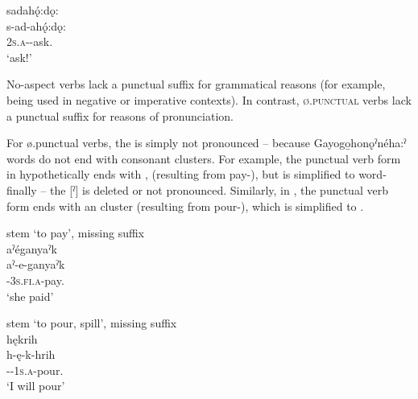 
\ex sadahǫ́:dǫ:\\\label{ex:punctendex4b}
\gll s-ad-ahǫ́:dǫ:\\
 \textsc{2s.a}-{\semireflexive}-ask.{\noaspect}\\
\glt `ask!'

\z
\z

No-aspect verbs lack a punctual suffix for grammatical reasons (for example, being used in negative or imperative contexts). In contrast, \textsc{ø.punctual} verbs lack a  punctual suffix for reasons of pronunciation.

For ø.punctual verbs, the  {\punctual} is simply not pronounced -- because Gayogo̱honǫˀnéha:ˀ words do not end with consonant clusters. For example, the punctual verb form in  hypothetically ends with , (resulting from  pay-{\punctual}), but  is simplified to   word-finally -- the [ˀ] {\punctual} is deleted or not pronounced. Similarly, in , the punctual verb form ends with an  cluster (resulting from  pour-{\punctual}), which is simplified to .

\ea\label{ex:punctendex2} stem  ‘to pay’, missing  \textsc{\punctual} suffix\\
aˀéganyaˀk\\\label{ex:punctendex2a}
\gll aˀ-e-ganyaˀk\\
 {\factual}-\textsc{3s.fi.a}-pay.{\zeropunctual}\\
\glt `she paid'
\z


\newpage
\ea\label{ex:punctendex3} stem  ‘to pour, spill’, missing  \textsc{\punctual} suffix\\
hękrih\\\label{ex:punctendex3a}
\gll h-ę-k-hrih\\
 {\translocative}-{\future}-\textsc{1s.a}-pour.{\zeropunctual}\\
\glt `I will pour'
\z


